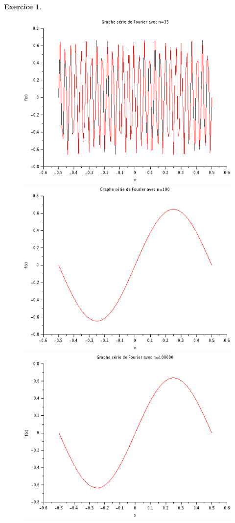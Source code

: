 \documentclass[a4paper,11pt]{article}
\newtheorem{exo}{Exercice}
\begin{document}
\begin{exo}
\begin{figure}[h]
\includegraphics[scale=0.7]{../annexes/images/fourier_35.PNG}
\includegraphics[scale=0.7]{../annexes/images/fourier_100.PNG}
\includegraphics[scale=0.7]{../annexes/images/fourier_100000.PNG}

\end{figure}
\end{exo}
\end{document}
